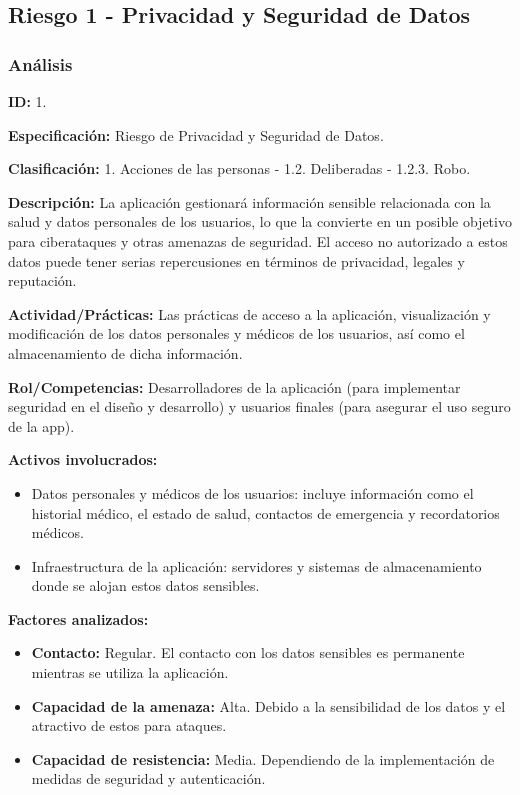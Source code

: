 \documentclass[a4paper,12pt]{article}
\begin{document}
    \subsection{Riesgo 1 - Privacidad y Seguridad de Datos}
    \subsubsection{Análisis}
    \par \textbf{ID:} 1.
    \par \textbf{Especificación:} Riesgo de Privacidad y Seguridad de Datos.
    \par \textbf{Clasificación:} 1. Acciones de las personas - 1.2. Deliberadas - 1.2.3. Robo.
    \par \textbf{Descripción:}  La aplicación gestionará información sensible relacionada con la salud y datos personales de los usuarios, lo que la convierte en un posible objetivo para ciberataques y otras amenazas de seguridad. El acceso no autorizado a estos datos puede tener serias repercusiones en términos de privacidad, legales y reputación.
    \par \textbf{Actividad/Prácticas:} Las prácticas de acceso a la aplicación, visualización y modificación de los datos personales y médicos de los usuarios, así como el almacenamiento de dicha información.
    \par \textbf{Rol/Competencias:} Desarrolladores de la aplicación (para implementar seguridad en el diseño y desarrollo) y usuarios finales (para asegurar el uso seguro de la app).
    \par \textbf{Activos involucrados:}
    \begin{itemize}
        \item Datos personales y médicos de los usuarios: incluye información como el historial médico, el estado de salud, contactos de emergencia y recordatorios médicos.
        \item Infraestructura de la aplicación: servidores y sistemas de almacenamiento donde se alojan estos datos sensibles.
    \end{itemize}
    \par \textbf{Factores analizados:}
    \begin{itemize}
        \item \textbf{Contacto:} Regular. El contacto con los datos sensibles es permanente mientras se utiliza la aplicación.
        \item \textbf{Capacidad de la amenaza:} Alta. Debido a la sensibilidad de los datos y el atractivo de estos para ataques.
        \item \textbf{Capacidad de resistencia:} Media. Dependiendo de la implementación de medidas de seguridad y autenticación.
    \end{itemize}
\end{document}
